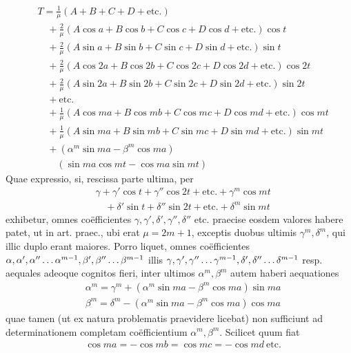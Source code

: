 \[
\begin{aligned}
&T=\frac1\mu(A+B+C+D+\mathrm{etc.})\\[5pt]
&\quad+\frac2\mu(A\cos a+B\cos b+C\cos c+D\cos d+\mathrm{etc.})\cos t\\[5pt]
&\quad+\frac2\mu(A\sin a+B\sin b+C\sin c+D\sin d+\mathrm{etc.})\sin t\\[5pt]
&\quad+\frac2\mu(A\cos2a+B\cos2b+C\cos2c+D\cos2d+\mathrm{etc.})\cos2t\\[5pt]
&\quad+\frac2\mu(A\sin2a+B\sin2b+C\sin2c+D\sin2d+\mathrm{etc.})\sin2t\\[5pt]
&\quad+\mathrm{etc.}\\[5pt]
&\quad+\frac1\mu(A\cos ma+B\cos mb+C\cos mc+D\cos md+\mathrm{etc.})\cos mt\\[5pt]
&\quad+\frac1\mu(A\sin ma+B\sin mb+C\sin mc+D\sin md+\mathrm{etc.})\sin mt\\[5pt]
&\quad+(\alpha^m\sin ma-\beta^m\cos ma)\\[5pt]&\qquad(\sin ma\cos mt-\cos ma\sin mt)
\end{aligned}
\]
Quae expressio, si, rescissa parte ultima, per
\[
\begin{aligned}
&\gamma+\gamma'\cos t+\gamma''\cos2t+\mathrm{etc.}+\gamma^m\cos mt\\[5pt]
&\quad+\delta'\sin t+\delta''\sin2t+\mathrm{etc.}+\delta^m\sin mt
\end{aligned}
\]
exhibetur, omnes co\"efficientes $\gamma,\gamma',\delta',\gamma'',\delta''$ etc. praecise eosdem valores habere patet, ut in art. praec., ubi erat $\mu=2m+1$, exceptis duobus ultimis $\gamma^m,\delta^m$, qui illic duplo erant maiores. Porro liquet, omnes co\"efficientes
$\alpha,\alpha',\alpha''\mathinner{.\,.\,.}\alpha^{m-1},\beta',\beta''\mathinner{.\,.\,.}\beta^{m-1}$ illis $\gamma,\gamma',\gamma''\mathinner{.\,.\,.}\gamma^{m-1},\delta',\delta''\mathinner{.\,.\,.}\delta^{m-1}$ resp. aequales adeoque cognitos fieri, inter ultimos $\alpha^m,\beta^m$ autem haberi aequationes
\[
\begin{aligned}
&\alpha^m=\gamma^m+(\alpha^m\sin ma-\beta^m\cos ma)\sin ma\\[5pt]
&\beta^m=\delta^m-(\alpha^m\sin ma-\beta^m\cos ma)\cos ma
\end{aligned}
\]
quae tamen (ut ex natura problematis praevidere licebat) non sufficiunt ad determinationem completam co\"efficientium $\alpha^m,\beta^m$. Scilicet quum fiat
\[
\begin{aligned}
&\cos ma=-\cos mb=\cos mc=-\cos md\ \mathrm{etc.}
\end{aligned}
\]
